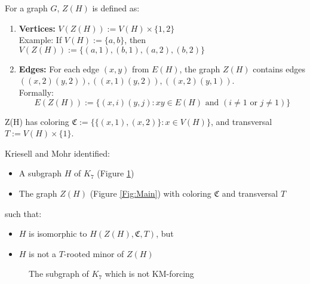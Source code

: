 \begin{defn}[$Z(H)$]
\label{defn:zg}
For a graph $G$, $Z(H)$ is defined as:
    \begin{enumerate}
        \item \textbf{Vertices:} $V(Z(H)) := V(H) \times \{1, 2\}$ \\
 Example: If $V(H):= \{a, b\}$, then $V(Z(H)):= \{(a,1), (b,1), (a,2), (b,2)\}$

        \item \textbf{Edges:} 
 For each edge $(x,y)$ from $E(H)$, the graph $Z(H)$ contains edges $((x,2)(y,2)), ((x,1)(y,2)),
 ((x,2)(y,1))$. \\
 Formally: \[ E(Z(H)) := \{(x,i)(y,j) : xy \in E(H) \text{ and } (i \neq 1 \text{ or } j \neq 1)\} \]
    \end{enumerate}
 Z(H) has coloring $\mathfrak{C} := \{\{(x,1),(x,2)\} : x \in V(H)\}$, and transversal $T := V(H) \times \{1\}$.

\end{defn}


Kriesell and Mohr identified:
\begin{itemize}
\item A subgraph $H$ of $K_7$ (Figure \ref{Fig:counterexample})
\item The graph $Z(H)$ (Figure \ref{Fig:Main}) with coloring $\mathfrak{C}$ and transversal $T$
\end{itemize}
such that:
\begin{itemize}
\item $H$ is isomorphic to $H(Z(H), \mathfrak{C}, T)$, but
\item $H$ is not a $T$-rooted minor of $Z(H)$
\end{itemize}

\begin{figure}[H]
    \centering
        \caption{The subgraph of $K_7$ which is not KM-forcing}
        \label{Fig:counterexample}
\end{figure}




